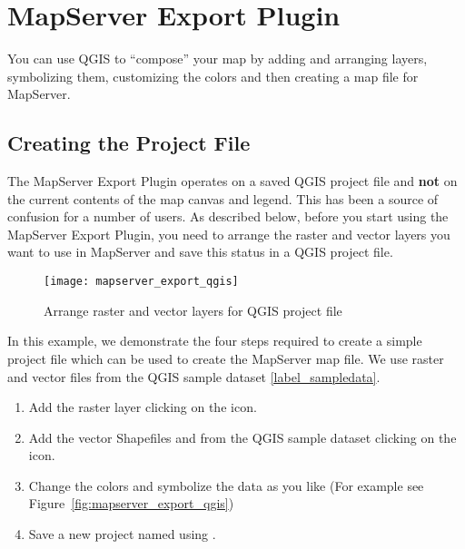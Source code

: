 
\section{MapServer Export Plugin}\label{sec:mapserver_export}

\updatedisclaimer

You can use QGIS to ``compose'' your map by adding and arranging layers,
symbolizing them, customizing the colors and then creating a map file
for MapServer.

\subsection{Creating the Project File}

The MapServer Export Plugin operates on a saved QGIS project file and
\textbf{not} on the current contents of the map canvas and legend. This
has been a source of confusion for a number of users. As described below,
before you start using the MapServer Export Plugin, you need to arrange
the raster and vector layers you want to use in MapServer and save this
status in a QGIS project file.

\begin{figure}[ht]
\centering
  \texttt{[image: mapserver\_export\_qgis]}
   \caption{Arrange raster and vector layers for QGIS project file \nixcaption}
  \label{fig:mapserver_export_qgs}
\end{figure}

In this example, we demonstrate the four steps required to create a simple
project file which can be used to create the MapServer map file.
We use raster and vector files from the QGIS sample dataset \ref{label_sampledata}.

\begin{enumerate}
\item Add the raster layer  clicking on the
 icon.
\item Add the vector Shapefiles  and
 from the QGIS sample dataset clicking on the
 icon.
\item Change the colors and symbolize the data as you like (For example see
Figure~\ref{fig:mapserver_export_qgis})
\item Save a new project named  using
 \arrow {}.
\end{enumerate}

